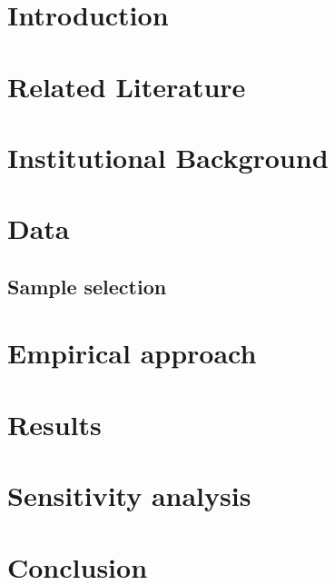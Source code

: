 \documentclass[a4paper, 10pt]{article}
\begin{document}


\newpage{}\setcounter{page}{1}
\section{Introduction} \label{sec:Introduction}


\section{Related Literature} \label{sec:Literature}


\section{Institutional Background} \label{sec:InstBackground}


\section{Data} \label{sec:Data}

\subsection{Sample selection} \label{subsec:sample}

\section{Empirical approach} \label{sec:Empirical}


\section{Results} \label{sec:Results}

\section{Sensitivity analysis} \label{sec:Sensitivity}


\section{Conclusion} \label{sec:Conclusion}


\clearpage
\printbibliography






\end{document}

